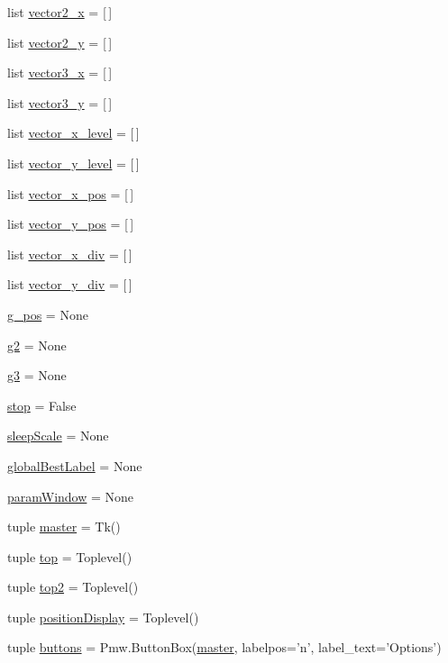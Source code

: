 \begin{CompactItemize}
list \hyperlink{namespacepsostart_44f8a24c235a0dab6015706df65ef687}{vector2\_\-x} = \mbox{[}$\,$\mbox{]}
\item 
list \hyperlink{namespacepsostart_e3fbef44f0ac39316031f1849adf2f7b}{vector2\_\-y} = \mbox{[}$\,$\mbox{]}
\item 
list \hyperlink{namespacepsostart_5f1379b781c073c257cbcf71f5441e2e}{vector3\_\-x} = \mbox{[}$\,$\mbox{]}
\item 
list \hyperlink{namespacepsostart_310eb124618fa97b0e053e7f99598122}{vector3\_\-y} = \mbox{[}$\,$\mbox{]}
\item 
list \hyperlink{namespacepsostart_dd73efc9aeeedb85bf87ecd3cb22632d}{vector\_\-x\_\-level} = \mbox{[}$\,$\mbox{]}
\item 
list \hyperlink{namespacepsostart_153af18e59f1c0fd2819ce28b6284e2f}{vector\_\-y\_\-level} = \mbox{[}$\,$\mbox{]}
\item 
list \hyperlink{namespacepsostart_17225f0f703ff68e39b1466c10eb833c}{vector\_\-x\_\-pos} = \mbox{[}$\,$\mbox{]}
\item 
list \hyperlink{namespacepsostart_2199cd5cd71d450746a957acdccb8042}{vector\_\-y\_\-pos} = \mbox{[}$\,$\mbox{]}
\item 
list \hyperlink{namespacepsostart_106a94902d0877943428c3d1edea2167}{vector\_\-x\_\-div} = \mbox{[}$\,$\mbox{]}
\item 
list \hyperlink{namespacepsostart_17ee232a94f4121a3be65ff3b515d183}{vector\_\-y\_\-div} = \mbox{[}$\,$\mbox{]}
\item 
\hyperlink{namespacepsostart_a4626f705c0ad45f935cbdc017503911}{g\_\-pos} = None
\item 
\hyperlink{namespacepsostart_579ddeab252424f678b85072ac2783ce}{g2} = None
\item 
\hyperlink{namespacepsostart_53a8463b5040b72717e300fff85403c3}{g3} = None
\item 
\hyperlink{namespacepsostart_112eb4712e14a578b7c44cef2b0e5b1f}{stop} = False
\item 
\hyperlink{namespacepsostart_603522924f52baf38e412d8667edd3a5}{sleepScale} = None
\item 
\hyperlink{namespacepsostart_16120c58348b037f3026552129c4a703}{globalBestLabel} = None
\item 
\hyperlink{namespacepsostart_be59abaa2019ac92419e98b269eb793d}{paramWindow} = None
\item 
tuple \hyperlink{namespacepsostart_6f96baa861a0624d8fc7f23a25059d9f}{master} = Tk()
\item 
tuple \hyperlink{namespacepsostart_9e1a1e315c078ee7ab2876530b46f706}{top} = Toplevel()
\item 
tuple \hyperlink{namespacepsostart_713a0c7137e9e999e15e95c7c6f968d2}{top2} = Toplevel()
\item 
tuple \hyperlink{namespacepsostart_7b05fb7d8575f94e505d13af00c8af04}{positionDisplay} = Toplevel()
\item 
tuple \hyperlink{namespacepsostart_064c9be2d06affdbfa450b811666f684}{buttons} = Pmw.ButtonBox(\hyperlink{namespacepsostart_6f96baa861a0624d8fc7f23a25059d9f}{master}, labelpos='n', label\_\-text='Options')
\end{CompactItemize}


